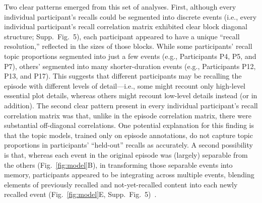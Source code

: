 \documentclass[10pt]{article}
\newcommand{\corrmats}{5}
\begin{document}
Two clear patterns emerged from this set of analyses.  First, although every individual participant's recalls could be segmented into discrete events (i.e., every individual participant's recall correlation matrix exhibited clear block diagonal structure; Supp.\ Fig.~\corrmats), each participant appeared to have a unique ``recall resolution,'' reflected in the sizes of those blocks.  While some participants' recall topic proportions segmented into just a few events (e.g., Participants P4, P5, and P7), others' segmented into many shorter-duration events (e.g., Participants P12, P13, and P17).  This suggests that different participants may be recalling the episode with different levels of detail---i.e., some might recount only high-level essential plot details, whereas others might recount low-level details instead (or in addition).  The second clear pattern present in every individual participant's recall correlation matrix was that, unlike in the episode correlation matrix, there were substantial off-diagonal correlations.  One potential explanation for this finding is that the topic models, trained only on episode annotations, do not capture topic proportions in participants' ``held-out'' recalls as accurately.  A second possibility is that, whereas each event in the original episode was (largely) separable from the others (Fig.~\ref{fig:model}B), in transforming those separable events into memory, participants appeared to be integrating across multiple events, blending elements of previously recalled and not-yet-recalled content into each newly recalled event (Fig.~\ref{fig:model}E, Supp.\ Fig.~\corrmats)~\citep{MannEtal11, HowaEtal12, Mann19}.
\end{document}
